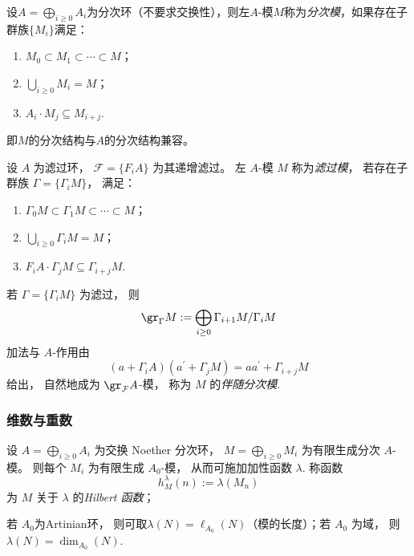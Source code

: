 \begin{definition}
    设$A=\bigoplus_{i\ge0}A_i$为分次环（不要求交换性），则左$A$-模$M$称为\emph{分次模}，如果存在子群族$\{M_i\}$满足：
    \begin{enumerate}[label=(\roman*)]
        \item $M_0\subset M_1\subset\cdots\subset M$；
        \item $\bigcup_{i\ge0}M_i=M$；
        \item $A_i\cdot M_j\subseteq M_{i+j}$.
    \end{enumerate}
    即$M$的分次结构与$A$的分次结构兼容。
\end{definition}


\begin{definition}
    设 $A$ 为滤过环，
    $\mathcal{F}=\{F_iA\}$ 为其递增滤过。
    左 $A$-模 $M$ 称为\emph{滤过模}，
    若存在子群族 $\Gamma=\{\Gamma_iM\}$，
    满足：
    \begin{enumerate}[label=(\roman*)]
        \item
              $\Gamma_0M\subset \Gamma_1M\subset\cdots\subset M$；
        \item
              $\bigcup_{i\ge0}\Gamma_iM=M$；
        \item
              $F_iA\cdot\Gamma_jM\subseteq\Gamma_{i+j}M$.
    \end{enumerate}
\end{definition}

\begin{proposition}
    若 $\Gamma=\{\Gamma_iM\}$ 为滤过，
    则
    \[
        \gr_\Gamma M
        :=
        \bigoplus_{i\ge0}\Gamma_{i+1}M/\Gamma_iM
    \]
    加法与 $A$-作用由 \[
        (a+\Gamma_iA)(a^\prime+\Gamma_jM)
        =
        aa^\prime+\Gamma_{i+j}M
    \]
    给出，
    自然地成为 $\gr_{\mathcal{F}}A$-模，
    称为 $M$ 的\emph{伴随分次模}.
\end{proposition}




\subsubsection{维数与重数}


\begin{definition}
    \label{def:Hilbert 函数}
    设
    $A=\bigoplus_{i\ge0}A_i$
    为交换 Noether 分次环，
    $ M=\bigoplus_{i\ge0}M_i$
    为有限生成分次 $A$-模。
    则每个 $M_i$ 为有限生成 $A_0$-模，
    从而可施加加性函数 $\lambda$.
    称函数
    \[
        h_M^\lambda(n)
        :=
        \lambda(M_n)
    \]
    为 $M$ 关于 $\lambda$ 的\emph{Hilbert 函数}；

    \begin{remark}
        若 $A_0$为Artinian环， 则可取$\lambda(N)=\ell_{A_0}(N)$（模的长度）；若 $A_0$ 为域， 则 $\lambda(N)=\dim_{A_0}(N)$.
    \end{remark}
\end{definition}


